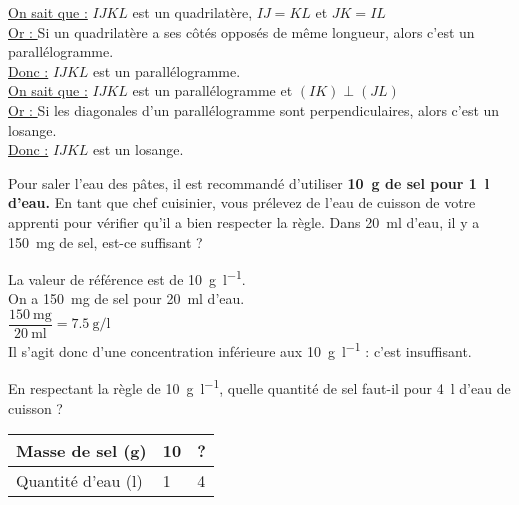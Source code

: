 \documentclass[../Cours.tex]{subfiles}
\begin{document}
\begin{questions}
    {\color{rouge}
        \underline{On sait que :} $IJKL$ est un quadrilatère, $IJ=KL$ et $JK=IL$\\
        \underline{Or : } Si un quadrilatère a ses côtés opposés de même longueur, alors c'est un parallélogramme.\\
        \underline{Donc :} $IJKL$ est un parallélogramme.\\

        \underline{On sait que :} $IJKL$ est un parallélogramme et $(IK)\perp(JL)$\\
        \underline{Or : } Si les diagonales d'un parallélogramme sont perpendiculaires, alors c'est un losange.\\
        \underline{Donc :} $IJKL$ est un losange.
    }

    \clearpage
    Pour saler l'eau des pâtes, il est recommandé d'utiliser \textbf{\qty{10}{\gram} de sel pour \qty{1}{\litre} d'eau.}
    \question En tant que chef cuisinier, vous prélevez de l'eau de cuisson de votre apprenti pour vérifier qu'il a bien respecter la règle. Dans \qty{20}{\ml} d'eau, il y a \qty{150}{\milli\gram} de sel, est-ce suffisant ?

    {\color{rouge}
    \begin{center}
        La valeur de référence est de \qty{10}{\gram\per\litre}.\\
        On a \qty{150}{\milli\gram} de sel pour \qty{20}{\milli\litre} d'eau.\\
        $\dfrac{\qty{150}{\milli\gram}}{\qty{20}{\milli\litre}} = \qty{7.5}{\gram\per\litre}$\\
        Il s'agit donc d'une concentration inférieure aux \qty{10}{\gram\per\litre} : c'est insuffisant.
    \end{center}        
    }
    
    \question En respectant la règle de \qty{10}{\gram\per\litre}, quelle quantité de sel faut-il pour \qty{4}{\litre} d'eau de cuisson ?

    {\color{rouge}
    \begin{center}
        \begin{tabularx}{0.5\linewidth}{|l|X|X|}\hline
            Masse de sel (\unit{\gram}) & 10 & ? \\\hline
            Quantité d'eau (\unit{\litre}) & 1 & 4 \\\hline
        \end{tabularx}\\
        

\end{center}}
\end{questions}
\end{document}
